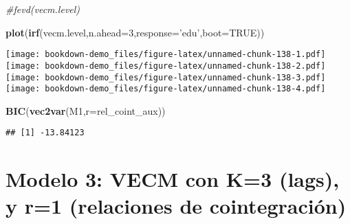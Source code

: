 \documentclass[]{book}
\newenvironment{Shaded}{\begin{snugshade}}{\end{snugshade}}
\newcommand{\KeywordTok}[1]{\textcolor[rgb]{0.13,0.29,0.53}{\textbf{#1}}}
\newcommand{\DataTypeTok}[1]{\textcolor[rgb]{0.13,0.29,0.53}{#1}}
\newcommand{\DecValTok}[1]{\textcolor[rgb]{0.00,0.00,0.81}{#1}}
\newcommand{\StringTok}[1]{\textcolor[rgb]{0.31,0.60,0.02}{#1}}
\newcommand{\CommentTok}[1]{\textcolor[rgb]{0.56,0.35,0.01}{\textit{#1}}}
\newcommand{\OtherTok}[1]{\textcolor[rgb]{0.56,0.35,0.01}{#1}}
\newcommand{\OperatorTok}[1]{\textcolor[rgb]{0.81,0.36,0.00}{\textbf{#1}}}
\newcommand{\NormalTok}[1]{#1}
\theoremstyle{definition}
\theoremstyle{definition}
\theoremstyle{definition}
\theoremstyle{remark}
\begin{document}
\begin{Shaded}
\begin{Highlighting}[]
\CommentTok{#fevd(vecm.level)}
\end{Highlighting}
\end{Shaded}

\begin{Shaded}
\begin{Highlighting}[]
\KeywordTok{plot}\NormalTok{(}\KeywordTok{irf}\NormalTok{(vecm.level,}\DataTypeTok{n.ahead=}\DecValTok{3}\NormalTok{,}\DataTypeTok{response=}\StringTok{'edu'}\NormalTok{,}\DataTypeTok{boot=}\OtherTok{TRUE}\NormalTok{))}
\end{Highlighting}
\end{Shaded}

\texttt{[image: bookdown-demo\_files/figure-latex/unnamed-chunk-138-1.pdf]}
\texttt{[image: bookdown-demo\_files/figure-latex/unnamed-chunk-138-2.pdf]}
\texttt{[image: bookdown-demo\_files/figure-latex/unnamed-chunk-138-3.pdf]}
\texttt{[image: bookdown-demo\_files/figure-latex/unnamed-chunk-138-4.pdf]}

\begin{Shaded}
\begin{Highlighting}[]
\KeywordTok{BIC}\NormalTok{(}\KeywordTok{vec2var}\NormalTok{(M1,}\DataTypeTok{r=}\NormalTok{rel_coint_aux))}
\end{Highlighting}
\end{Shaded}

\begin{verbatim}
## [1] -13.84123
\end{verbatim}

\section{Modelo 3: VECM con K=3 (lags), y r=1 (relaciones de
cointegración)}\label{modelo-3-vecm-con-k3-lags-y-r1-relaciones-de-cointegracion}

\begin{Shaded}
\end{Shaded}
\end{document}
